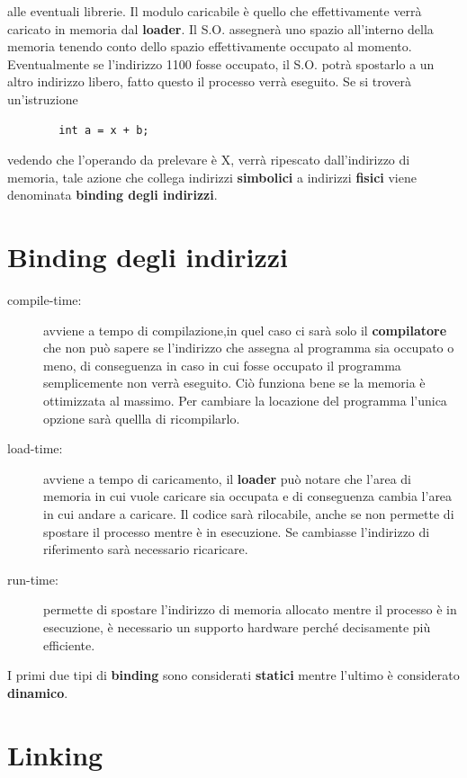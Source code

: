 \documentclass[a4paper, 12pt]{book}
\begin{document}
alle eventuali librerie. Il modulo caricabile è quello che effettivamente verrà caricato in memoria dal \textbf{loader}. Il S.O.
assegnerà uno spazio all'interno della memoria tenendo conto dello spazio effettivamente occupato al momento. Eventualmente se
l'indirizzo 1100 fosse occupato, il S.O. potrà spostarlo a un altro indirizzo libero, fatto questo il processo verrà eseguito.
Se si troverà un'istruzione 
\begin{center}
    \begin{verbatim}
        int a = x + b;
    \end{verbatim}
\end{center}
vedendo che l'operando da prelevare è X, verrà ripescato dall'indirizzo di memoria, tale azione che collega indirizzi 
\textbf{simbolici} a indirizzi \textbf{fisici} viene denominata \textbf{binding degli indirizzi}.

\section{Binding degli indirizzi}

\begin{description}
    \item[compile-time:] avviene a tempo di compilazione,in quel caso ci sarà solo il 
    \textbf{compilatore} che non può sapere se l'indirizzo che assegna al programma sia occupato o meno, di conseguenza 
    in caso in cui fosse occupato il programma semplicemente non verrà eseguito. Ciò funziona bene se la memoria è ottimizzata
    al massimo. Per cambiare la locazione del programma l'unica opzione sarà quellla di ricompilarlo.
    \item[load-time:]avviene a tempo di caricamento, il \textbf{loader} può notare che l'area di memoria in cui vuole
    caricare sia occupata e di conseguenza cambia l'area in cui andare a caricare. Il codice sarà rilocabile, anche se non permette
    di spostare il processo mentre è in esecuzione. Se cambiasse l'indirizzo di riferimento sarà necessario ricaricare.
    \item[run-time:]permette di spostare l'indirizzo di memoria allocato mentre il processo è in esecuzione, è necessario un 
    supporto hardware perché decisamente più efficiente. 
\end{description}
I primi due tipi di \textbf{binding} sono considerati \textbf{statici} mentre l'ultimo è considerato \textbf{dinamico}.

\section{Linking}
\end{document}
